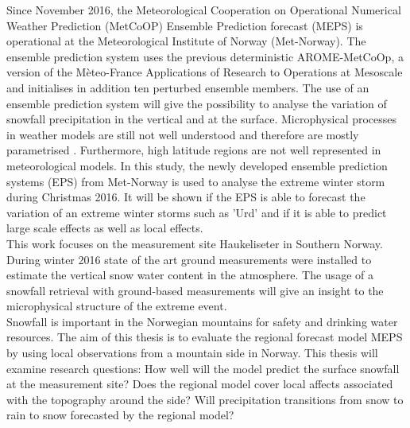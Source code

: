 % 
Since November 2016, the Meteorological Cooperation on Operational Numerical Weather Prediction (MetCoOP) Ensemble Prediction forecast (MEPS) is operational at the Meteorological Institute of Norway (Met-Norway). The ensemble prediction system uses the previous deterministic AROME-MetCoOp, a version of the Mèteo-France Applications of Research to Operations at Mesoscale and initialises in addition ten perturbed ensemble members. The use of an ensemble prediction system will give the possibility to analyse the variation of snowfall precipitation in the vertical and at the surface.
Microphysical processes in weather models are still not well understood and therefore are mostly parametrised \citep{muller_arome-metcoop:_2017}. Furthermore, high latitude regions are not well represented in meteorological models. %
In this study, the newly developed ensemble prediction systems (EPS) from Met-Norway is used to analyse the extreme winter storm during Christmas 2016. It will be shown if the EPS is able to forecast the variation of an extreme winter storms such as 'Urd' and if it is able to predict large scale effects as well as local effects. 
\\
This work focuses on the measurement site Haukeliseter in Southern Norway. During winter 2016 state of the art ground measurements were installed to estimate the vertical snow water content in the atmosphere. The usage of a snowfall retrieval with ground-based measurements will give an insight to the microphysical structure of the extreme event. %
\\
Snowfall is important in the Norwegian mountains for safety and drinking water resources. The aim of this thesis is to evaluate the regional forecast model MEPS by using local observations from a mountain side in Norway. This thesis will examine research questions: How well will the model predict the surface snowfall at the measurement site? 
Does the regional model cover local affects associated with the topography around the side? Will precipitation transitions from snow to rain to snow forecasted by the regional model?
